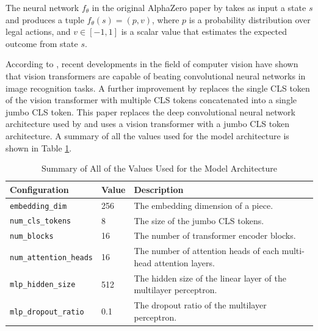 The neural network $f_{\theta}$ in the original AlphaZero paper by \cite{silver2017masteringchessshogiselfplay} takes as input a state $s$ and produces a tuple $f_{\theta}(s) = (p, v)$, where $p$ is a probability distribution over legal actions, and $v \in [-1, 1]$ is a scalar value that estimates the expected outcome from state $s$.

According to \cite{dosovitskiy2021imageworth16x16words}, recent developments in the field of computer vision have shown that vision transformers are capable of beating convolutional neural networks in image recognition tasks. A further improvement by \cite{fuller2025simpler} replaces the single CLS token of the vision transformer with multiple CLS tokens concatenated into a single jumbo CLS token. This paper replaces the deep convolutional neural network architecture used by \cite{Popic_Boskovic_Brest_2021} and uses a vision transformer with a jumbo CLS token architecture. A summary of all the values used for the model architecture is shown in Table \ref{tab:model-configuration-summary}.

\begin{table}[H]
  \centering
  \begin{tabular}{llp{7.5cm}}
    \hline 
    Configuration                  & Value & Description                                                         \\ \hline
    \texttt{embedding\_dim}        & 256   & The embedding dimension of a piece.                                 \\
    \texttt{num\_cls\_tokens}      & 8     & The size of the jumbo CLS tokens.                                   \\
    \texttt{num\_blocks}           & 16    & The number of transformer encoder blocks.                           \\
    \texttt{num\_attention\_heads} & 16    & The  number of attention heads of each multi-head attention layers. \\
    \texttt{mlp\_hidden\_size}     & 512   & The hidden size of the linear layer of the multilayer perceptron.   \\
    \texttt{mlp\_dropout\_ratio}   & 0.1   & The dropout ratio of the multilayer perceptron.                     \\ \hline
  \end{tabular}
  \caption{Summary of All of the Values Used for the Model Architecture}
  \label{tab:model-configuration-summary}
\end{table}

